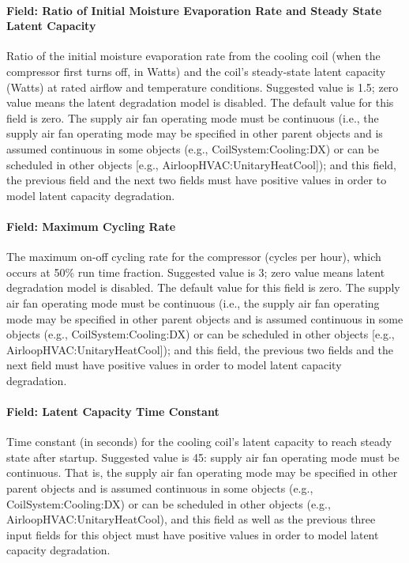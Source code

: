 \paragraph{Field: Ratio of Initial Moisture Evaporation Rate and Steady State Latent Capacity}\label{field-ratio-of-initial-moisture-evaporation-rate-and-steady-state-latent-capacity}

Ratio of the initial moisture evaporation rate from the cooling coil (when the compressor first turns off, in Watts) and the coil's steady-state latent capacity (Watts) at rated airflow and temperature conditions. Suggested value is 1.5; zero value means the latent degradation model is disabled. The default value for this field is zero. The supply air fan operating mode must be continuous (i.e., the supply air fan operating mode may be specified in other parent objects and is assumed continuous in some objects (e.g., CoilSystem:Cooling:DX) or can be scheduled in other objects {[}e.g., AirloopHVAC:UnitaryHeatCool{]}); and this field, the previous field and the next two fields must have positive values in order to model latent capacity degradation.

\paragraph{Field: Maximum Cycling Rate}\label{field-maximum-cycling-rate}

The maximum on-off cycling rate for the compressor (cycles per hour), which occurs at 50\% run time fraction. Suggested value is 3; zero value means latent degradation model is disabled. The default value for this field is zero. The supply air fan operating mode must be continuous (i.e., the supply air fan operating mode may be specified in other parent objects and is assumed continuous in some objects (e.g., CoilSystem:Cooling:DX) or can be scheduled in other objects {[}e.g., AirloopHVAC:UnitaryHeatCool{]}); and this field, the previous two fields and the next field must have positive values in order to model latent capacity degradation.

\paragraph{Field: Latent Capacity Time Constant}\label{field-latent-capacity-time-constant}

Time constant (in seconds) for the cooling coil's latent capacity to reach steady state after startup. Suggested value is 45: supply air fan operating mode must be continuous. That is, the supply air fan operating mode may be specified in other parent objects and is assumed continuous in some objects (e.g., CoilSystem:Cooling:DX) or can be scheduled in other objects (e.g., AirloopHVAC:UnitaryHeatCool), and this field as well as the previous three input fields for this object must have positive values in order to model latent capacity degradation.

